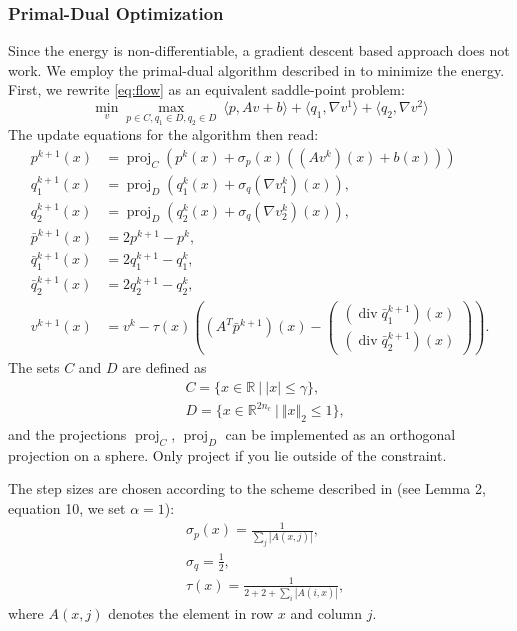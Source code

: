 \documentclass[A4,12pt]{article}
\DeclareMathOperator{\divop}{div}
\DeclareMathOperator*{\proj}{proj}
\newcommand{\R}{\mathbb{R}}
\newcommand{\norm}[1]{\Vert #1 \Vert}
\providecommand{\iprod}[2]{\langle#1,#2\rangle}
\begin{document}
\subsubsection{Primal-Dual Optimization}
Since the energy is non-differentiable, a gradient descent based approach does not work. We employ the primal-dual algorithm described in \cite{Chambolle-Pock-jmiv11,Pock-Chambolle-iccv11} to minimize the energy. First, we rewrite \eqref{eq:flow} as an equivalent saddle-point problem:
\begin{equation}
\min_{v} \max_{p \in C,q_1 \in D,q_2 \in D} ~ \iprod{p}{Av + b} + \iprod{q_1}{\nabla v^1} + \iprod{q_2}{\nabla v^2}
\end{equation}
The update equations for the algorithm then read:
\begin{equation}
\begin{aligned}
p^{k+1}(x)&=\proj_C(p^k(x) + \sigma_p(x) ((Av^k)(x) + b(x))) \\
q_1^{k+1}(x)&=\proj_D(q_1^k(x) + \sigma_q (\nabla v_1^k)(x)),\\
q_2^{k+1}(x)&=\proj_D(q_2^k(x) + \sigma_q (\nabla v_2^k)(x)),\\
\bar p^{k+1}(x)&=2 p^{k+1} - p^k,\\
\bar q_1^{k+1}(x)&=2 q_1^{k+1} - q_1^k,\\
\bar q_2^{k+1}(x)&=2 q_2^{k+1} - q_2^k,\\
v^{k+1}(x)&=v^k - \tau(x) \left((A^T \bar p^{k+1})(x) -
\begin{pmatrix}
(\divop \bar q_1^{k+1})(x)\\
(\divop \bar q_2^{k+1})(x)
\end{pmatrix}
\right).
\end{aligned}
\end{equation}
The sets $C$ and $D$ are defined as
\begin{equation}
\begin{aligned}
& C = \{x \in \R ~|~ |x| \leq \gamma \}, \\
& D = \{x \in \R^{2 n_c} ~|~ \norm{x}_2 \leq 1 \}, 
\end{aligned}
\end{equation}
and the projections $\proj_C$, $\proj_D$ can be implemented as an orthogonal projection on a sphere. Only project if you lie outside of the constraint.

The step sizes are chosen according to the scheme described in \cite{Pock-Chambolle-iccv11} (see Lemma 2, equation 10, we set $\alpha=1$):
\begin{equation}
  \begin{aligned}
    &\sigma_p(x) = \frac{1}{\sum_j |A(x,j)|}, \\
    &\sigma_q = \frac{1}{2},\\
    &\tau(x) = \frac{1}{2 + 2 + \sum_i |A(i,x)|},
  \end{aligned}
\end{equation}
where $A(x,j)$ denotes the element in row $x$ and column $j$.
\end{document}
